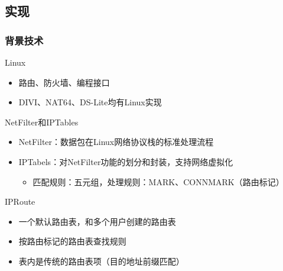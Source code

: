 \documentclass{beamer}
\begin{document}
\subsection{实现}
\begin{frame}
  \frametitle{背景技术}
  \begin{block}{Linux}
    \begin{itemize}
    \item 路由、防火墙、编程接口
    \item DIVI、NAT64、DS-Lite均有Linux实现
    \end{itemize}
  \end{block}

  \begin{block}{NetFilter和IPTables}
    \begin{itemize}
    \item NetFilter：数据包在Linux网络协议栈的标准处理流程
    \item IPTabels：对NetFilter功能的划分和封装，支持网络虚拟化
      \begin{itemize}
      \item 匹配规则：五元组，处理规则：MARK、CONNMARK（路由标记）
      \end{itemize}
    \end{itemize}
  \end{block}

  \begin{block}{IPRoute}
    \begin{itemize}
    \item 一个默认路由表，和多个用户创建的路由表
    \item 按路由标记的路由表查找规则
    \item 表内是传统的路由表项（目的地址前缀匹配）
    \end{itemize}
  \end{block}
\end{frame}
\end{document}
